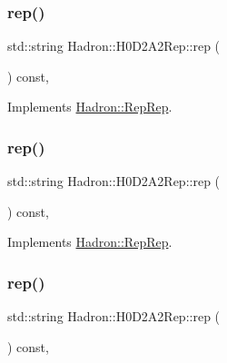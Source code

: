 \subsubsection{\texorpdfstring{rep()}{rep()}\hspace{0.1cm}{\footnotesize\ttfamily [2/5]}}
{\footnotesize\ttfamily std\+::string Hadron\+::\+H0\+D2\+A2\+Rep\+::rep (\begin{DoxyParamCaption}{ }\end{DoxyParamCaption}) const\hspace{0.3cm}{\ttfamily [inline]}, {\ttfamily [virtual]}}



Implements \mbox{\hyperlink{structHadron_1_1RepRep_ab3213025f6de249f7095892109575fde}{Hadron\+::\+Rep\+Rep}}.

\mbox{\label{structHadron_1_1H0D2A2Rep_ae0f8b84aedb60c30e04ff9aa344142a6}} 
\subsubsection{\texorpdfstring{rep()}{rep()}\hspace{0.1cm}{\footnotesize\ttfamily [3/5]}}
{\footnotesize\ttfamily std\+::string Hadron\+::\+H0\+D2\+A2\+Rep\+::rep (\begin{DoxyParamCaption}{ }\end{DoxyParamCaption}) const\hspace{0.3cm}{\ttfamily [inline]}, {\ttfamily [virtual]}}



Implements \mbox{\hyperlink{structHadron_1_1RepRep_ab3213025f6de249f7095892109575fde}{Hadron\+::\+Rep\+Rep}}.

\mbox{\label{structHadron_1_1H0D2A2Rep_ae0f8b84aedb60c30e04ff9aa344142a6}} 
\subsubsection{\texorpdfstring{rep()}{rep()}\hspace{0.1cm}{\footnotesize\ttfamily [4/5]}}
{\footnotesize\ttfamily std\+::string Hadron\+::\+H0\+D2\+A2\+Rep\+::rep (\begin{DoxyParamCaption}{ }\end{DoxyParamCaption}) const\hspace{0.3cm}{\ttfamily [inline]}, {\ttfamily [virtual]}}



